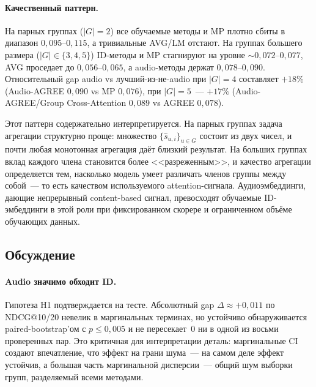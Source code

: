 \paragraph{Качественный паттерн.} На парных группах ($|G| = 2$) все обучаемые методы и MP плотно сбиты в диапазон $0{,}095$--$0{,}115$, а тривиальные AVG/LM отстают. На группах большего размера ($|G| \in \{3, 4, 5\}$) ID-методы и MP стагнируют на уровне $\sim 0{,}072$--$0{,}077$, AVG проседает до $0{,}056$--$0{,}065$, а audio-методы держат $0{,}078$--$0{,}090$. Относительный gap audio vs лучший-из-не-audio при $|G| = 4$ составляет $+18\%$ (Audio-AGREE $0{,}090$ vs MP $0{,}076$), при $|G| = 5$~--- $+17\%$ (Audio-AGREE/Group Cross-Attention $0{,}089$ vs AGREE $0{,}078$).

Этот паттерн содержательно интерпретируется. На парных группах задача агрегации структурно проще: множество $\{\hat{s}_{u, i}\}_{u \in G}$ состоит из двух чисел, и почти любая монотонная агрегация даёт близкий результат. На больших группах вклад каждого члена становится более <<разреженным>>, и качество агрегации определяется тем, насколько модель умеет различать членов группы между собой~--- то есть качеством используемого attention-сигнала. Аудиоэмбеддинги, дающие непрерывный content-based сигнал, превосходят обучаемые ID-эмбеддинги в этой роли при фиксированном скорере и ограниченном объёме обучающих данных.

\subsection{Обсуждение}\label{subsec:ch3:results-discuss}

\paragraph{Audio значимо обходит ID.} Гипотеза H1 подтверждается на тесте. Абсолютный gap $\Delta \approx +0{,}011$ по NDCG@10/20 невелик в маргинальных терминах, но устойчиво обнаруживается paired-bootstrap'ом с $p \leq 0{,}005$ и не пересекает~0 ни в одной из восьми проверенных пар. Это критичная для интерпретации деталь: маргинальные CI создают впечатление, что эффект на грани шума~--- на самом деле эффект устойчив, а большая часть маргинальной дисперсии~--- общий шум выборки групп, разделяемый всеми методами.

